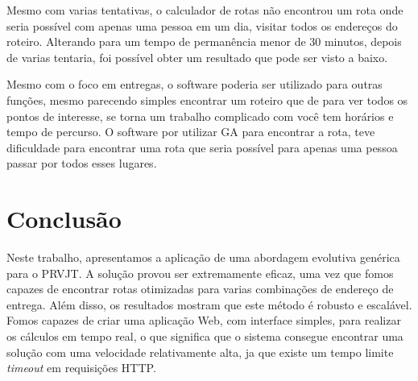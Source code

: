 Mesmo com varias tentativas, o calculador de rotas não encontrou um rota onde seria possível com apenas uma pessoa em um dia, visitar todos os endereços do roteiro. Alterando para um tempo de permanência menor de 30 minutos, depois de varias tentaria, foi possível obter um resultado que pode ser visto a baixo.

\begin{center}
	\label{fig:Turista}
\end{center}

Mesmo com o foco em entregas, o software poderia ser utilizado para outras funções, mesmo parecendo simples encontrar um roteiro que de para ver todos os pontos de interesse, se torna um trabalho complicado com você tem horários e tempo de percurso. O software por utilizar GA para encontrar a rota, teve dificuldade para encontrar uma rota que seria possível para apenas uma pessoa passar por todos esses lugares.

\section{Conclusão}

Neste trabalho, apresentamos a aplicação de uma abordagem evolutiva genérica para o PRVJT. A solução provou ser extremamente eficaz, uma vez que fomos capazes de encontrar rotas otimizadas para varias combinações de endereço de entrega. Além disso, os resultados mostram que este método é robusto e escalável. 
Fomos capazes de criar uma aplicação Web, com interface simples, para realizar os cálculos em tempo real, o que significa que o sistema consegue encontrar uma solução com uma velocidade relativamente alta, ja que existe um tempo limite \textit{timeout} em requisições HTTP.

